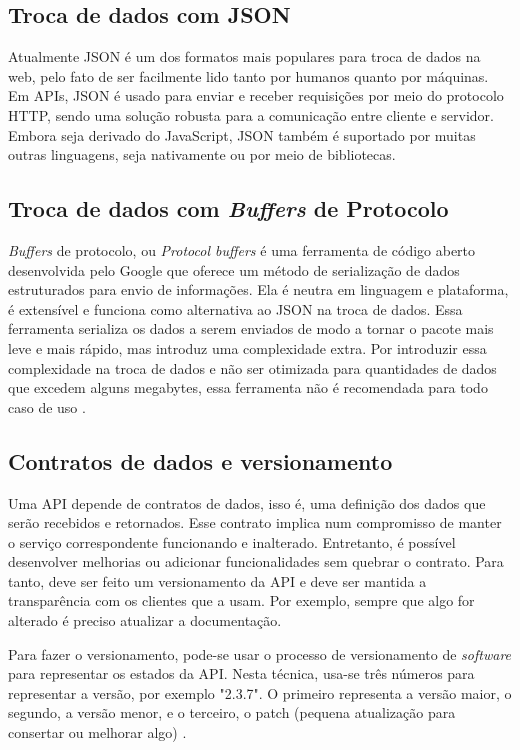 \subsection{Troca de dados com JSON}
Atualmente JSON é um dos formatos mais populares para troca de dados na web, pelo fato de ser facilmente lido tanto por humanos quanto por máquinas. Em APIs, JSON é usado para enviar e receber requisições por meio do protocolo HTTP, sendo uma solução robusta para a comunicação entre cliente e servidor. Embora seja derivado do JavaScript, JSON também é suportado por muitas outras linguagens, seja nativamente ou por meio de bibliotecas.  \cite{json_bourhis_2020}

\subsection{Troca de dados com \emph{Buffers} de Protocolo}
\emph{Buffers} de protocolo, ou \emph{Protocol buffers} é uma ferramenta de código aberto desenvolvida pelo Google que oferece um método de serialização de dados estruturados para envio de informações. Ela é neutra em linguagem e plataforma, é extensível e funciona como alternativa ao JSON na troca de dados. Essa ferramenta serializa os dados a serem enviados de modo a tornar o pacote mais leve e mais rápido, mas introduz uma complexidade extra. Por introduzir essa complexidade na troca de dados e não ser otimizada para quantidades de dados que excedem alguns megabytes, essa ferramenta não é recomendada para todo caso de uso \cite{google-protocol-buffers}.

\subsection{Contratos de dados e versionamento}
Uma API depende de contratos de dados, isso é, uma definição dos dados que serão recebidos e retornados. Esse contrato implica num compromisso de manter o serviço correspondente funcionando e inalterado. Entretanto, é possível desenvolver melhorias ou adicionar funcionalidades sem quebrar o contrato. Para tanto, deve ser feito um versionamento da API e deve ser mantida a transparência com os clientes que a usam. Por exemplo, sempre que algo for alterado é preciso atualizar a documentação.

Para fazer o versionamento, pode-se usar o processo de versionamento de \emph{software} para representar os estados da API. Nesta técnica, usa-se três números para representar a versão, por exemplo "2.3.7". O primeiro representa a versão maior, o segundo, a versão menor, e o terceiro, o patch (pequena atualização para consertar ou melhorar algo) \cite{wiki_software_versioning_2022}.

